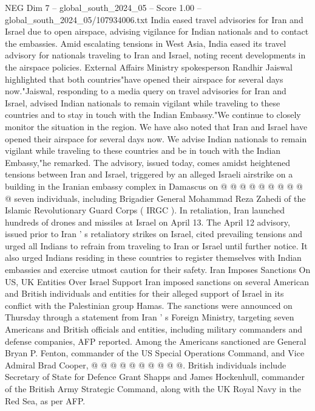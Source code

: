 \begin{textsample}{NEG Dim 7 – global\_south\_2024\_05 – Score 1.00 – global\_south\_2024\_05/107934006.txt}  \label{ex:f7_neg_248}
India eased travel advisories for Iran and Israel due to open airspace, advising vigilance for Indian nationals and to contact the embassies.
Amid escalating tensions in West Asia, India eased its travel advisory for nationals traveling to Iran and Israel, noting recent developments in the airspace policies.
External Affairs Ministry spokesperson Randhir Jaiswal highlighted that both countries"have opened their airspace for several days now."Jaiswal, responding to a media query on travel advisories for Iran and Israel, advised Indian nationals to remain vigilant while traveling to these countries and to stay in touch with the Indian Embassy."We continue to closely monitor the situation in the region.
We have also noted that Iran and Israel have opened their airspace for several days now.
We advise Indian nationals to remain vigilant while traveling to these countries and be in touch with the Indian Embassy,"he remarked.
The advisory, issued today, comes amidst heightened tensions between Iran and Israel, triggered by an alleged Israeli airstrike on a building in the Iranian embassy complex in Damascus on @ @ @ @ @ @ @ @ @ @ seven individuals, including Brigadier General Mohammad Reza Zahedi of the Islamic Revolutionary Guard Corps ( IRGC ).
In retaliation, Iran launched hundreds of drones and missiles at Israel on April 13.
The April 12 advisory, issued prior to Iran ' s retaliatory strikes on Israel, cited prevailing tensions and urged all Indians to refrain from traveling to Iran or Israel until further notice.
It also urged Indians residing in these countries to register themselves with Indian embassies and exercise utmost caution for their safety.
Iran Imposes Sanctions On US, UK Entities Over Israel Support Iran imposed sanctions on several American and British individuals and entities for their alleged support of Israel in its conflict with the Palestinian group Hamas.
The sanctions were announced on Thursday through a statement from Iran ' s Foreign Ministry, targeting seven Americans and British officials and entities, including military commanders and defense companies, AFP reported.
Among the Americans sanctioned are General Bryan P.
Fenton, commander of the US Special Operations Command, and Vice Admiral Brad Cooper, @ @ @ @ @ @ @ @ @ @.
British individuals include Secretary of State for Defence Grant Shapps and James Hockenhull, commander of the British Army Strategic Command, along with the UK Royal Navy in the Red Sea, as per AFP.

\end{textsample}
